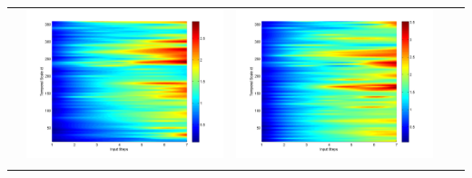 \documentclass[11pt]{article}
\begin{document}
\begin{table}[H]
{\begin{tabular}{ccccc}
&\begin{minipage}{.3\textwidth}\includegraphics[width=\linewidth]{resultgraph/06810000pep.png}\end{minipage}
&\begin{minipage}{.3\textwidth}\includegraphics[width=\linewidth]{resultgraph/06810000pepq.png}\end{minipage}
\\
&

\end{tabular}}
\end{table}
\end{document}
